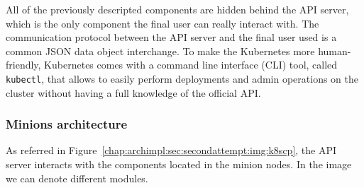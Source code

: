 All of the previously descripted components are hidden behind the API server,
which is the only component the final user can really interact with. The
communication protocol between the API server and the final user used is a
common JSON data object interchange. To make the Kubernetes more human-friendly,
Kubernetes comes with a command line interface (CLI) tool, called
\verb!kubectl!, that allows to easily perform deployments and admin operations
on the cluster without having a full knowledge of the official API.

\subsubsection{Minions architecture}

As referred in Figure~\ref{chap:archimpl:sec:secondattempt:img:k8scp}, the API
server interacts with the components located in the minion nodes. In the image
we can denote different modules.
